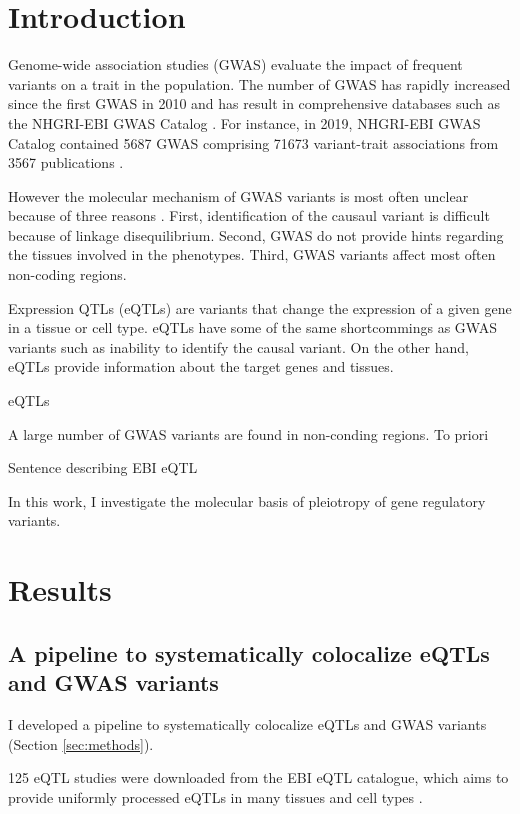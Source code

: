 \section*{Introduction}\label{sec:introduction}

Genome-wide association studies (GWAS) evaluate the impact of frequent variants on a trait in the population.
%
The number of GWAS has rapidly increased since the first GWAS in 2010 and has result in comprehensive databases such as the NHGRI-EBI GWAS Catalog \citep{2018.Parkinson.Buniello}.
%
For instance, in 2019, NHGRI-EBI GWAS Catalog contained 5687 GWAS comprising 71673 variant-trait associations from 3567 publications \citep{2018.Parkinson.Buniello}.

However the molecular mechanism of GWAS variants is most often unclear because of three reasons \citep{2020.Trynka.CanoGamez}.
%
First, identification of the causaul variant is difficult because of linkage disequilibrium.
%
Second, GWAS do not provide hints regarding the tissues involved in the phenotypes.
%
Third, GWAS variants affect most often non-coding regions.

Expression QTLs (eQTLs) are variants that change the expression of a given gene in a tissue or cell type.
%
eQTLs have some of the same shortcommings as GWAS variants such as inability to identify the causal variant.
%
On the other hand, eQTLs provide information about the target genes and tissues.

eQTLs 


A large number of GWAS variants are found in non-conding regions.
To priori

Sentence describing EBI eQTL

In this work, I investigate the molecular basis of pleiotropy of gene regulatory variants.

\section*{Results}\label{s:results}

\subsection*{A pipeline to systematically colocalize eQTLs and GWAS variants}

I developed a pipeline to systematically colocalize eQTLs and GWAS variants (Section \ref{sec:methods}).

125 eQTL studies were downloaded from the EBI eQTL catalogue, which aims to provide uniformly processed eQTLs in many tissues and cell types \citep{2021.Alasoo.Kerimov}.


